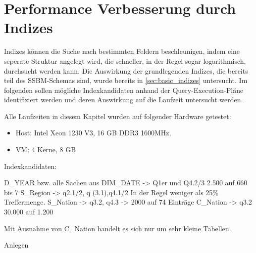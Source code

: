 \chapter{Performance Verbesserung durch Indizes}

Indizes können die Suche nach bestimmten Feldern beschleunigen, indem eine seperate Struktur angelegt wird, die schneller, in der Regel sogar logarithmisch, durchsucht werden kann.
Die Auswirkung der grundlegenden Indizes, die bereits teil des SSBM-Schemas sind, wurde bereits in \ref{sec:basic_indizes} untersucht. 
Im folgenden sollen mögliche Indexkandidaten anhand der Query-Execution-Pläne identifiziert werden und deren Auswirkung auf die Laufzeit untersucht werden.

Alle Laufzeiten in diesem Kapitel wurden auf folgender Hardware getestet:
\begin{itemize}
    \item Host: Intel Xeon 1230 V3, 16 GB DDR3 1600MHz, 
    \item VM: 4 Kerne, 8 GB
\end{itemize}




Indexkandidaten:

D_YEAR bzw. alle Sachen aus DIM_DATE -> Q1er und Q4.2/3 2.500 auf 660 bis 7
S_Region -> q2.1/2, q (3.1),q4.1/2 In der Regel weniger als 25\% Treffermenge.
S_Nation -> q3.2, q4.3 -> 2000 auf 74 Einträge
C_Nation -> q3.2 30.000 auf 1.200

Mit Ausnahme von C_Nation handelt es sich nur um sehr kleine Tabellen.

Anlegen 




